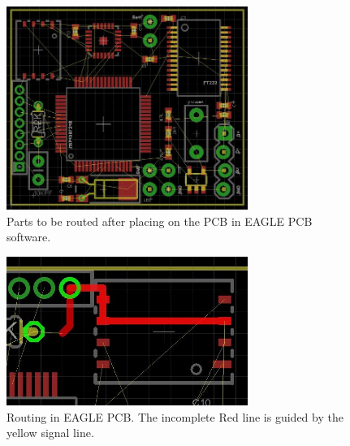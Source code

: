 \begin{figure}
\begin{center}
\includegraphics[width=0.7\textwidth]{images/Layout2.jpg}
\caption{Parts to be routed after placing on the PCB in EAGLE PCB software.}
\label{Fig:Layout2}
\end{center}
\end{figure}
\begin{figure}
\begin{center}
\includegraphics[width=0.7\textwidth]{images/Layout3.jpg}
\caption{Routing in EAGLE PCB. The incomplete Red line is guided by the yellow signal line.}
\label{Fig:Layout3}
\end{center}
\end{figure}
